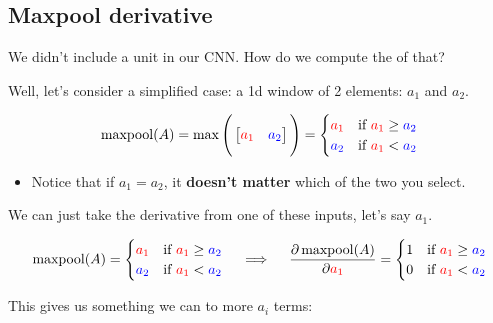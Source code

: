     \subsection{Maxpool derivative}

        We didn't include a  unit in our CNN. How do we compute the  of that?

        Well, let's consider a simplified case: a 1d window of 2 elements: $a_1$ and $a_2$.

        \begin{equation}
            \operatorname{maxpool}(A) = \max \Bigg(\begin{bmatrix}
                \textcolor{red}{a_1} & \textcolor{blue}{a_2}
            \end{bmatrix}\Bigg) 
            =
            \begin{cases}
                \textcolor{red}{a_1} & \text{if }\textcolor{red}{a_1} \geq  \textcolor{blue}{a_2} \\
                \textcolor{blue}{a_2} & \text{if }\textcolor{red}{a_1} < \textcolor{blue}{a_2}
            \end{cases}
        \end{equation}

        \begin{itemize}
            \item Notice that if $a_1=a_2$, it \textbf{doesn't matter} which of the two you select.
        \end{itemize}

        We can just take the derivative from one of these inputs, let's say $a_1$.

        \begin{equation}
            \operatorname{maxpool}(A) =
            \begin{cases}
                \textcolor{red}{a_1} & \text{if }\textcolor{red}{a_1} \geq  \textcolor{blue}{a_2} \\
                \textcolor{blue}{a_2} & \text{if }\textcolor{red}{a_1} < \textcolor{blue}{a_2}
            \end{cases}
            \quad\implies\quad
            \frac{\partial \operatorname{maxpool}(A)}{\partial \textcolor{red}{a_1}} =
            \begin{cases}
                1 & \text{if }\textcolor{red}{a_1} \geq  \textcolor{blue}{a_2} \\
                0 & \text{if }\textcolor{red}{a_1} < \textcolor{blue}{a_2}
            \end{cases}
        \end{equation}

        This gives us something we can  to more $a_i$ terms:

